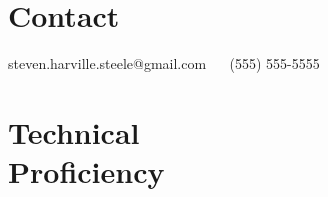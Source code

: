 \documentclass[margin,line]{resume}
\begin{document}
\begin{resume}

\vspace{1em}



\section{\mysidestyle Contact}

steven.harville.steele@gmail.com \ \textbf{\textbar} \ (555) 555-5555












\section{\mysidestyle Technical\\Proficiency}


\end{resume}
\end{document}

